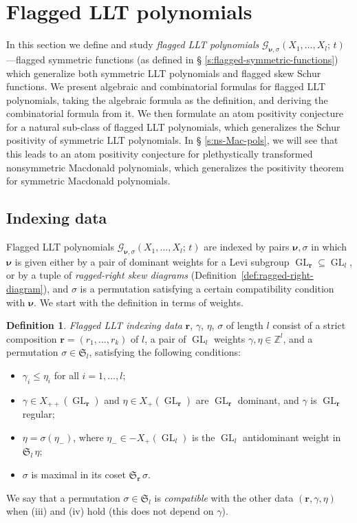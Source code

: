 \documentclass[12pt]{amsart}
\theoremstyle{definition}
\newtheorem{defn}[thm]{Definition}
\theoremstyle{remark}
\newcommand{\ZZ}{{\mathbb Z}}
\newcommand{\rr}{{\mathbf r}}
\newcommand{\nubold}{{\boldsymbol \nu }}
\newcommand{\Sfrak}{{\mathfrak S}}
\newcommand{\Gcal}{{\mathcal G}}
\DeclareMathOperator{\GL}{GL}
\begin{document}
\section{Flagged LLT polynomials} \label{s:flagged-LLT}

In this section we define and study {\em flagged LLT polynomials}
$\Gcal _{\nubold ,\sigma }(X_{1},\ldots,X_{l};\, t)$---flagged
symmetric functions (as defined in \S
\ref{s:flagged-symmetric-functions}) which generalize both symmetric
LLT polynomials and flagged skew Schur functions.  We present
algebraic and combinatorial formulas for flagged LLT polynomials,
taking the algebraic formula as the definition, and deriving the
combinatorial formula from it.  We then formulate an atom positivity
conjecture for a natural sub-class of flagged LLT polynomials, which
generalizes the Schur positivity of symmetric LLT polynomials.  In \S
\ref{s:ns-Mac-pols}, we will see that this leads to an atom positivity
conjecture for plethystically transformed nonsymmetric Macdonald
polynomials, which generalizes the positivity theorem \cite{Haiman01}
for symmetric Macdonald polynomials.



\subsection{Indexing data}
\label{ss:indexing-data}

Flagged LLT polynomials $\Gcal _{\nubold ,\sigma
}(X_{1},\ldots,X_{l};\, t)$ are indexed by pairs $\nubold ,\sigma $ in
which $\nubold $ is given either by a pair of dominant weights for a
Levi subgroup $\GL _{\rr }\subseteq \GL _{l}$, or by a tuple of {\em
ragged-right skew diagrams}
(Definition~\ref{def:ragged-right-diagram}), and $\sigma $ is a
permutation satisfying a certain compatibility condition with $\nubold
$.  We start with the definition in terms of weights.

\begin{defn}\label{def:indexing-data}
{\em Flagged LLT indexing data} $\rr $, $\gamma $, $\eta $, $\sigma $
of length $l$ consist of a strict composition $\rr
=(r_{1},\ldots,r_{k})$ of $l$, a pair of $\GL _{l}$ weights $\gamma
,\eta \in \ZZ ^{l}$, and a permutation $\sigma \in \Sfrak _{l}$,
satisfying the following conditions:
\begin{itemize}
\item [(i)] $\gamma _{i}\leq \eta _{i}$ for all $i=1,\ldots,l$;
\item [(ii)] $\gamma \in X_{++}(\GL _{\rr })$ and $\eta \in X_{+}(\GL
_{\rr })$ are $\GL _{\rr }$ dominant, and $\gamma $ is $\GL _{\rr }$
regular;
\item [(iii)] $\eta =\sigma (\eta _{-})$, where $\eta _{-}\in
-X_{+}(\GL _{l})$ is the $\GL _{l}$ antidominant weight in
$\Sfrak _{l} \, \eta $;
\item [(iv)] $\sigma $ is maximal in its coset $\Sfrak _{\rr }\,
\sigma $.
\end{itemize}
We say that a permutation $\sigma \in \Sfrak _{l}$ is {\em compatible}
with the other data $(\rr ,\gamma, \eta )$ when (iii) and (iv) hold
(this does not depend on $\gamma $).
\end{defn}
\end{document}
